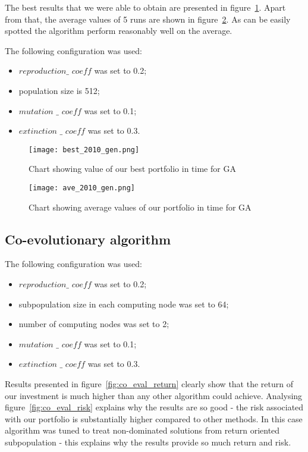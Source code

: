 The best results that we were able to obtain are presented in figure~\ref{fig:gen-algo}.
Apart from that, the average values of 5 runs are shown in figure~\ref{fig:gen-algo-ave-2010}.
As can be easily spotted the algorithm perform reasonably well on the average.

The following configuration was used:
\begin{itemize}
  \item $reproduction\_$ $coeff$ was set to 0.2;
  \item population size is 512;
  \item $mutation$ $\_$ $coeff$ was set to 0.1;
  \item $extinction$ $\_$ $coeff$ was set to 0.3.
\end{itemize}

\begin{figure}[ht]
  \begin{center}
    \texttt{[image: best\_2010\_gen.png]}
  \end{center}
  \caption{Chart showing value of our best portfolio in time for GA}
  \label{fig:gen-algo}
\end{figure}

\begin{figure}[ht]
  \begin{center}
    \texttt{[image: ave\_2010\_gen.png]}
  \end{center}
  \caption{Chart showing average values of our portfolio in time for GA}
  \label{fig:gen-algo-ave-2010}
\end{figure}

\subsection{Co-evolutionary algorithm}
\label{sec:co-evol-2}

The following configuration was used:
\begin{itemize}
  \item $reproduction\_$ $coeff$ was set to 0.2;
  \item subpopulation size in each computing node was set to 64;
  \item number of computing nodes was set to 2;
  \item $mutation$ $\_$ $coeff$ was set to 0.1;
  \item $extinction$ $\_$ $coeff$ was set to 0.3.
\end{itemize}

Results presented in figure~\ref{fig:co_eval_return} clearly show that the return of our investment is much higher than any other algorithm could achieve.  
Analysing figure~\ref{fig:co_eval_risk} explains why the results are so good - the risk associated with our portfolio is substantially higher compared to other methods.
In this case algorithm was tuned to treat non-dominated solutions from return oriented subpopulation - this explains why the results provide so much return and risk. 

